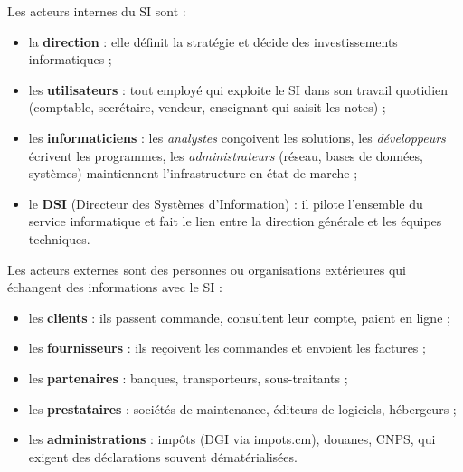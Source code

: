 \documentclass[11pt]{article}
\newcommand{\cle}[1]{{\popxbold\color{popdark}#1}}
\begin{document}
\begin{definition}
Les \cle{acteurs internes} du SI sont :
\begin{itemize}
\item la \textbf{direction} : elle définit la stratégie et décide des investissements informatiques ;
\item les \textbf{utilisateurs} : tout employé qui exploite le SI dans son travail quotidien (comptable, secrétaire, vendeur, enseignant qui saisit les notes) ;
\item les \textbf{informaticiens} : les \emph{analystes} conçoivent les solutions, les \emph{développeurs} écrivent les programmes, les \emph{administrateurs} (réseau, bases de données, systèmes) maintiennent l'infrastructure en état de marche ;
\item le \textbf{DSI} (Directeur des Systèmes d'Information) : il pilote l'ensemble du service informatique et fait le lien entre la direction générale et les équipes techniques.
\end{itemize}
\end{definition}

\begin{definition}
Les \cle{acteurs externes} sont des personnes ou organisations extérieures qui échangent des informations avec le SI :
\begin{itemize}
\item les \textbf{clients} : ils passent commande, consultent leur compte, paient en ligne ;
\item les \textbf{fournisseurs} : ils reçoivent les commandes et envoient les factures ;
\item les \textbf{partenaires} : banques, transporteurs, sous-traitants ;
\item les \textbf{prestataires} : sociétés de maintenance, éditeurs de logiciels, hébergeurs ;
\item les \textbf{administrations} : impôts (DGI via impots.cm), douanes, CNPS, qui exigent des déclarations souvent dématérialisées.
\end{itemize}
\end{definition}
\end{document}
